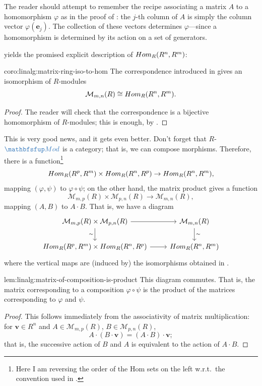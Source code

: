 The reader should attempt to remember the recipe associating a matrix
$A$ to a homomorphism $\varphi$ as in the proof of :
the $j$-th column of $A$ is simply the column vector
$\varphi(\mathbf{e}_j)$. The collection of these vectors determines
$\varphi$---since a homomorphism is determined by its action on a set
of generators.

 yields the promised explicit description of
$Hom_R(R^n, R^m)$:
\begin{coro}{}{coro:linalg:matrix-ring-iso-to-hom}
  The correspondence introduced in  gives an
  isomorphism of $R$-modules
  \[
    \mathcal{M}_{m,n}(R) \cong Hom_R(R^n, R^m).
  \]
\end{coro}
\begin{proof}
  The reader will check that the correspondence is a bijective
  homomorphism of $R$-modules; this is enough, by
  .
\end{proof}

This is very good news, and it gets even better. Don't forget that
$R$-$\categ{Mod}$ is a category; that is, we can compose morphisms.
Therefore, there is a function\footnote{Here I am reversing the order
  of the Hom sets on the left w.r.t.\ the convention used in
  .}
\[
  Hom_R(R^p, R^m) \times Hom_R(R^n, R^p) \to Hom_R(R^n, R^m),
\]
mapping $(\varphi, \psi)$ to $\varphi \circ \psi$; on the other hand,
the matrix product gives a function
\[
  \mathcal{M}_{m,p}(R) \times \mathcal{M}_{p,n}(R) \to
  \mathcal{M}_{m,n}(R),
\]
mapping $(A, B)$ to $A \cdot B$. That is, we have a diagram
\[
  \begin{tikzcd}
    \mathcal{M}_{m,p}(R) \times \mathcal{M}_{p,n}(R) \arrow[r]
    \arrow[d, "\sim"'] &
    \mathcal{M}_{m,n}(R) \arrow[d, "\sim"] \\
    \Hom_R(R^p, R^m) \times \Hom_R(R^n, R^p) \arrow[r] & \Hom_R(R^n,
    R^m)
  \end{tikzcd}
\]
where the vertical maps are (induced by) the isomorphisms obtained in
.

\begin{lem}{}{lem:linalg:matrix-of-composition-is-product}
  This diagram commutes. That is, the matrix corresponding to a
  composition $\varphi \circ \psi$ is the product of the matrices
  corresponding to $\varphi$ and $\psi$.
\end{lem}
\begin{proof}
  This follows immediately from the associativity of matrix
  multiplication: for $\mathbf{v} \in R^n$ and
  $A \in \mathcal{M}_{m,p}(R)$, $B \in \mathcal{M}_{p,n}(R)$,
  \[
    A \cdot (B \cdot \mathbf{v}) = (A \cdot B) \cdot \mathbf{v};
  \]
  that is, the successive action of $B$ and $A$ is equivalent to the
  action of $A \cdot B$.
\end{proof}

